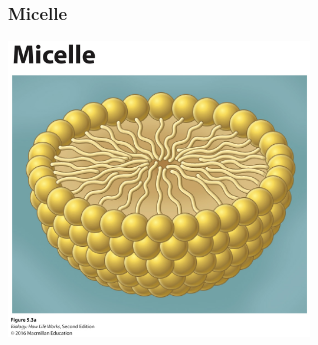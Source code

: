 \documentclass[10pt]{beamer}
\begin{document}
\begin{frame}[t]
\frametitle{Micelle}
\vspace{0.5cm}

	\begin{center}
		\includegraphics[width=0.6\textwidth]{figures/figure_05_03a.jpg}
	\end{center}
	
\end{frame}
\end{document}
